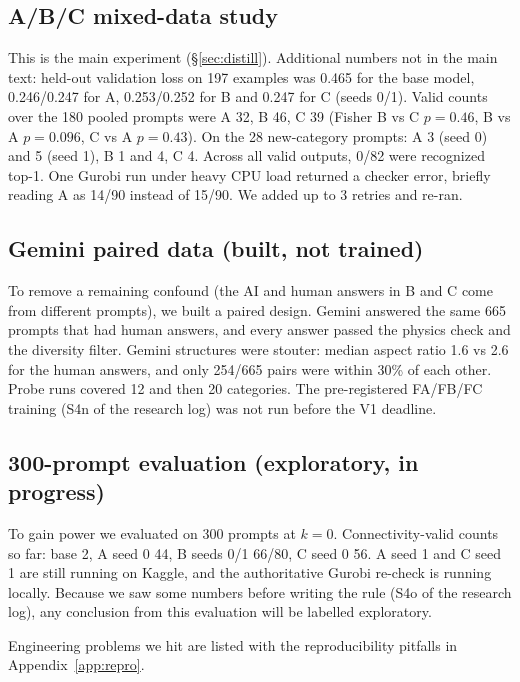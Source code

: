 \subsection{A/B/C mixed-data study}
\label{ex:mix}
This is the main experiment (\S\ref{sec:distill}). Additional numbers not in the main text: held-out validation loss on 197 examples was 0.465 for the base model, 0.246/0.247 for A, 0.253/0.252 for B and 0.247 for C (seeds 0/1). Valid counts over the 180 pooled prompts were A 32, B 46, C 39 (Fisher B vs C $p{=}0.46$, B vs A $p{=}0.096$, C vs A $p{=}0.43$). On the 28 new-category prompts: A 3 (seed 0) and 5 (seed 1), B 1 and 4, C 4. Across all valid outputs, 0/82 were recognized top-1. One Gurobi run under heavy CPU load returned a checker error, briefly reading A as 14/90 instead of 15/90. We added up to 3 retries and re-ran.

\subsection{Gemini paired data (built, not trained)}
\label{ex:gemini}
To remove a remaining confound (the AI and human answers in B and C come from different prompts), we built a paired design. Gemini answered the same 665 prompts that had human answers, and every answer passed the physics check and the diversity filter. Gemini structures were stouter: median aspect ratio 1.6 vs 2.6 for the human answers, and only 254/665 pairs were within 30\% of each other. Probe runs covered 12 and then 20 categories. The pre-registered FA/FB/FC training (S4n of the research log) was not run before the V1 deadline.

\subsection{300-prompt evaluation (exploratory, in progress)}
\label{ex:eval300}
To gain power we evaluated on 300 prompts at $k{=}0$. Connectivity-valid counts so far: base 2, A seed 0 44, B seeds 0/1 66/80, C seed 0 56. A seed 1 and C seed 1 are still running on Kaggle, and the authoritative Gurobi re-check is running locally. Because we saw some numbers before writing the rule (S4o of the research log), any conclusion from this evaluation will be labelled exploratory.

Engineering problems we hit are listed with the reproducibility pitfalls in Appendix~\ref{app:repro}.
